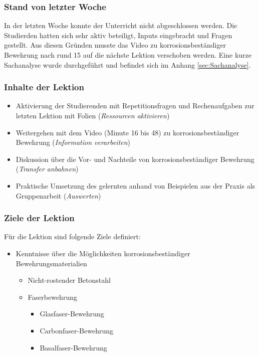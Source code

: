 \documentclass[
11pt,
captions=tableheading,
headsepline,
footsepline, 
captions=tableheading,
parskip=half-,
]{scrartcl}
\begin{document}
\subsubsection{Stand von letzter Woche}
In der letzten Woche konnte der Unterricht nicht abgeschlossen werden.
Die Studierden hatten sich sehr aktiv beteiligt, Inputs eingebracht und Fragen gestellt. 
Aus diesen Gründen musste das Video zu korrosionsbeständiger Bewehrung nach rund \SI{15}{\min} auf die nächste Lektion verschoben werden.
Eine kurze Sachanalyse wurde durchgeführt und befindet sich im Anhang \cref{sec:Sachanalyse}.

\subsubsection{Inhalte der Lektion}
\begin{itemize}
    \item Aktivierung der Studierenden mit Repetitionsfragen und Rechenaufgaben zur letzten Lektion mit Folien (\textit{Ressourcen aktivieren})
    \item Weitergehen mit dem Video (Minute 16 bis 48) zu korrosionsbeständiger Bewehrung (\textit{Information verarbeiten})
    \item Diskussion über die Vor- und Nachteile von korrosionsbeständiger Bewehrung (\textit{Transfer anbahnen})
    \item Praktische Umsetzung des gelernten anhand von Beispielen aus der Praxis als Gruppenarbeit (\textit{Auswerten})
\end{itemize}

\subsubsection{Ziele der Lektion}
Für die Lektion sind folgende Ziele definiert:
\begin{itemize}
    \item Kenntnisse über die Möglichkeiten korrosionsbeständiger Bewehrungsmaterialien
          \begin{itemize}
              \item Nicht-rostender Betonstahl
              \item Faserbewehrung
                    \begin{itemize}
                        \item Glasfaser-Bewehrung
                        \item Carbonfaser-Bewehrung
                        \item Basalfaser-Bewehrung
                    \end{itemize}
          \end{itemize}
\end{itemize}
\end{document}
